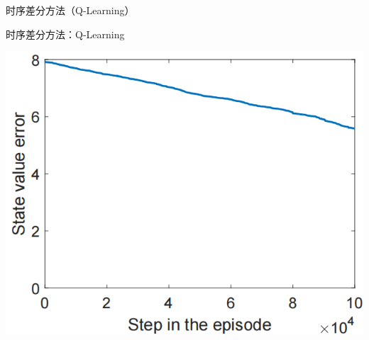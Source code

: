 \begin{section}{时序差分方法\alert{（Q-Learning）}}
\begin{frame}{时序差分方法：Q-Learning}
\begin{center}
\begin{minipage}{0.2\textwidth}
        \end{minipage}
        \hspace{1cm}
        \begin{minipage}{0.2\textwidth}
            \centering
            \includegraphics[width=\linewidth]{assets/e0.5statevalueerror.jpg}
        \end{minipage}
        \hspace{1cm}
    \end{center}
\end{frame}


\end{section}
